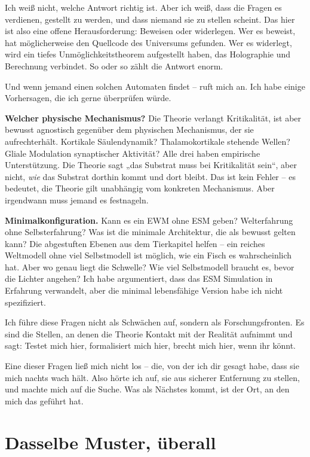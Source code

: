 \documentclass[11pt, twoside, openright]{book}
\begin{document}
Ich weiß nicht, welche Antwort richtig ist. Aber ich weiß, dass die Fragen es verdienen, gestellt zu werden, und dass niemand sie zu stellen scheint. Das hier ist also eine offene Herausforderung: Beweisen oder widerlegen. Wer es beweist, hat möglicherweise den Quellcode des Universums gefunden. Wer es widerlegt, wird ein tiefes Unmöglichkeitstheorem aufgestellt haben, das Holographie und Berechnung verbindet. So oder so zählt die Antwort enorm.

Und wenn jemand einen solchen Automaten findet -- ruft mich an. Ich habe einige Vorhersagen, die ich gerne überprüfen würde.

\textbf{Welcher physische Mechanismus?} Die Theorie verlangt Kritikalität, ist aber bewusst agnostisch gegenüber dem physischen Mechanismus, der sie aufrechterhält. Kortikale Säulendynamik? Thalamokortikale stehende Wellen? Gliale Modulation synaptischer Aktivität? Alle drei haben empirische Unterstützung. Die Theorie sagt „das Substrat muss bei Kritikalität sein“, aber nicht, \textit{wie} das Substrat dorthin kommt und dort bleibt. Das ist kein Fehler -- es bedeutet, die Theorie gilt unabhängig vom konkreten Mechanismus. Aber irgendwann muss jemand es festnageln.

\textbf{Minimalkonfiguration.} Kann es ein EWM ohne ESM geben? Welterfahrung ohne Selbsterfahrung? Was ist die minimale Architektur, die als bewusst gelten kann? Die abgestuften Ebenen aus dem Tierkapitel helfen -- ein reiches Weltmodell ohne viel Selbstmodell ist möglich, wie ein Fisch es wahrscheinlich hat. Aber wo genau liegt die Schwelle? Wie viel Selbstmodell braucht es, bevor die Lichter angehen? Ich habe argumentiert, dass das ESM Simulation in Erfahrung verwandelt, aber die minimal lebensfähige Version habe ich nicht spezifiziert.

Ich führe diese Fragen nicht als Schwächen auf, sondern als Forschungsfronten. Es sind die Stellen, an denen die Theorie Kontakt mit der Realität aufnimmt und sagt: Testet mich hier, formalisiert mich hier, brecht mich hier, wenn ihr könnt.

Eine dieser Fragen ließ mich nicht los -- die, von der ich dir gesagt habe, dass sie mich nachts wach hält. Also hörte ich auf, sie aus sicherer Entfernung zu stellen, und machte mich auf die Suche. Was als Nächstes kommt, ist der Ort, an den mich das geführt hat.

\chapter{Dasselbe Muster, überall}
\end{document}
